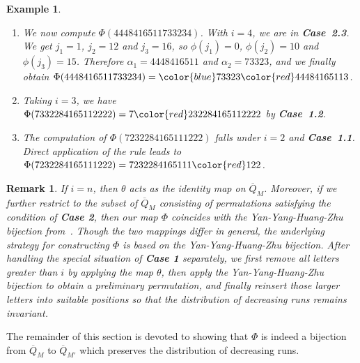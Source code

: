 \documentclass[11pt]{article}
\numberwithin{equation}{section}
\newtheorem{rem}[thm]{Remark}
\newtheorem{exa}[thm]{Example}
\newcommand{\cred}{\color{red}}
\newcommand{\cblue}{\color{blue}}
\def\oQ{\overline{Q}}
\begin{document}
\begin{exa}
\begin{enumerate}
		\item We now compute $\Phi(4448416511733234)$. With $i=4$, we are in {\bf Case~2.3}. We get $j_1=1$, $j_2=12$ and $j_3=16$, so $\phi(j_1)=0$, $\phi(j_2)=10$ and $\phi(j_3)=15$. Therefore $\alpha_1=4448416511$ and $\alpha_2=73323$, and we finally obtain $\Phi(4448416511733234)={\cblue 73323}{\cred 4448416511}3$.
		
		\item Taking $i=3$, we have $\Phi(7332284165112222)=7{\cred 2}32284165112222$ by {\bf Case~1.2}.
		
		\item The computation of $\Phi(7232284165111222)$ falls under $i=2$ and {\bf Case~1.1}. Direct application of the rule leads to $\Phi(7232284165111222)=7232284165111{\cred 1}22$.
	\end{enumerate}
\end{exa}

\begin{rem}
	If $i = n$, then $\theta$ acts as the identity map on $\oQ_M$. Moreover, if we further restrict to the subset of $\oQ_M$ consisting of permutations satisfying the condition of {\bf Case 2}, then our map $\Phi$ coincides with the Yan-Yang-Huang-Zhu bijection from~\cite{YanYangHuangZhu2022}. Though the two mappings differ in general, the underlying strategy for constructing $\Phi$ is based on the Yan-Yang-Huang-Zhu bijection. After handling the special situation of {\bf Case 1} separately, we first remove all letters greater than $i$ by applying the map $\theta$, then apply the Yan-Yang-Huang-Zhu bijection to obtain a preliminary permutation, and finally reinsert those larger letters into suitable positions so that the distribution of decreasing runs remains invariant.
\end{rem}

The remainder of this section is devoted to showing that $\Phi$ is indeed a bijection from $\oQ_M$ to $\oQ_{M'}$ which preserves the distribution of decreasing runs.
\end{document}
